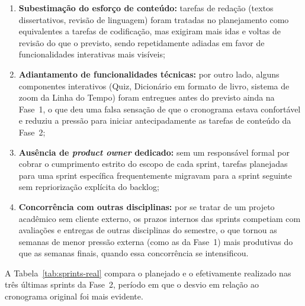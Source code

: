 \documentclass[12pt,a4paper]{article}
\begin{document}
\begin{enumerate}[leftmargin=*, label=\roman*.]
    \item \textbf{Subestimação do esforço de conteúdo:} tarefas de redação (textos
    dissertativos, revisão de linguagem) foram tratadas no planejamento como equivalentes a
    tarefas de codificação, mas exigiram mais idas e voltas de revisão do que o previsto,
    sendo repetidamente adiadas em favor de funcionalidades interativas mais visíveis;
    \item \textbf{Adiantamento de funcionalidades técnicas:} por outro lado, alguns componentes
    interativos (Quiz, Dicionário em formato de livro, sistema de zoom da Linha do Tempo) foram
    entregues antes do previsto ainda na Fase~1, o que deu uma falsa sensação de que o
    cronograma estava confortável e reduziu a pressão para iniciar antecipadamente as tarefas de
    conteúdo da Fase~2;
    \item \textbf{Ausência de \textit{product owner} dedicado:} sem um responsável formal por
    cobrar o cumprimento estrito do escopo de cada sprint, tarefas planejadas para uma sprint
    específica frequentemente migravam para a sprint seguinte sem repriorização explícita do
    backlog;
    \item \textbf{Concorrência com outras disciplinas:} por se tratar de um projeto acadêmico
    sem cliente externo, os prazos internos das sprints competiam com avaliações e entregas de
    outras disciplinas do semestre, o que tornou as semanas de menor pressão externa (como as da
    Fase~1) mais produtivas do que as semanas finais, quando essa concorrência se intensificou.
\end{enumerate}

A Tabela~\ref{tab:sprints-real} compara o planejado e o efetivamente realizado nas três
últimas sprints da Fase~2, período em que o desvio em relação ao cronograma original foi mais
evidente.
\end{document}
